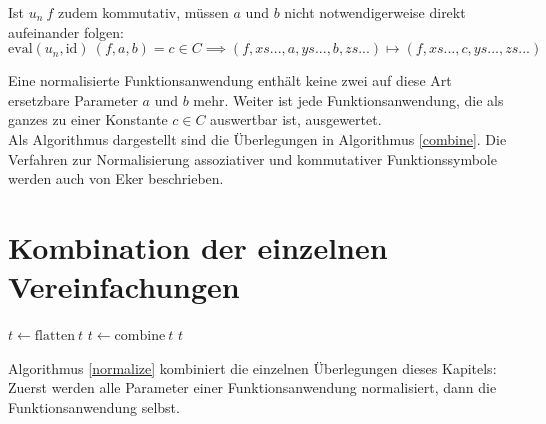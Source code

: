 Ist $u_n~f$ zudem kommutativ, müssen $a$ und $b$ nicht notwendigerweise direkt aufeinander folgen:
$$\mathrm{eval}(u_n, \mathrm{id})~(f, a, b) = c \in C \implies (f, xs..., a, ys..., b, zs...) \mapsto (f, xs..., c, ys..., zs...)$$

Eine normalisierte Funktionsanwendung enthält keine zwei auf diese Art ersetzbare Parameter $a$ und $b$ mehr. Weiter ist jede Funktionsanwendung, die als ganzes zu einer Konstante $c \in C$ auswertbar ist, ausgewertet.\\
Als Algorithmus dargestellt sind die Überlegungen in Algorithmus \ref{combine}. Die Verfahren zur Normalisierung assoziativer und kommutativer Funktionssymbole werden auch von Eker \cite{BipartiteGraphMatching} beschrieben.

\section{Kombination der einzelnen Vereinfachungen} \label{subsecKomboNormal}

\begin{algorithm}
\DontPrintSemicolon
\caption{$\mathrm{normalize} \colon T \rightarrow T$}\label{normalize}

$t \leftarrow \mathrm{flatten}~t$\;
$t \leftarrow \mathrm{combine}~t$\;
\Return $t$ 
\end{algorithm}
Algorithmus \ref{normalize} kombiniert die einzelnen Überlegungen dieses Kapitels: Zuerst werden alle Parameter einer Funktionsanwendung normalisiert, dann die Funktionsanwendung selbst.





